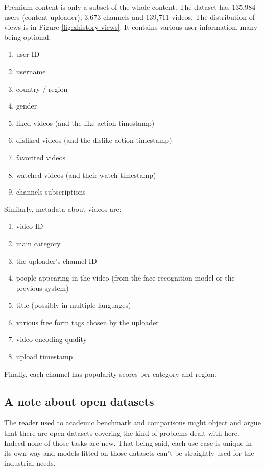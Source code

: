 Premium content is only a subset of the whole content. The dataset has 135,984 users (content uploader), 3,673 channels and 139,711 videos. The distribution of views is in Figure \ref{fig:xhistory-views}. It contains various user information, many being optional:

\begin{enumerate}
    \item user ID
    \item username
    \item country / region
    \item gender
    \item liked videos (and the like action timestamp)
    \item disliked videos (and the dislike action timestamp)
    \item favorited videos
    \item watched videos (and their watch timestamp)
    \item channels subscriptions
\end{enumerate}

Similarly, metadata about videos are:

\begin{enumerate}
    \item video ID
    \item main category
    \item the uploader's channel ID
    \item people appearing in the video (from the face recognition model or the previous system)
    \item title (possibly in multiple languages)
    \item various free form tags chosen by the uploader
    \item video encoding quality
    \item upload timestamp
\end{enumerate}

Finally, each channel has popularity scores per category and region.

\subsection{A note about open datasets}

The reader used to academic benchmark and comparisons might object and argue that there are open datasets covering the kind of problems dealt with here. Indeed none of those tasks are new. That being said, each use case is unique in its own way and models fitted on those datasets can't be straightly used for the industrial needs.

